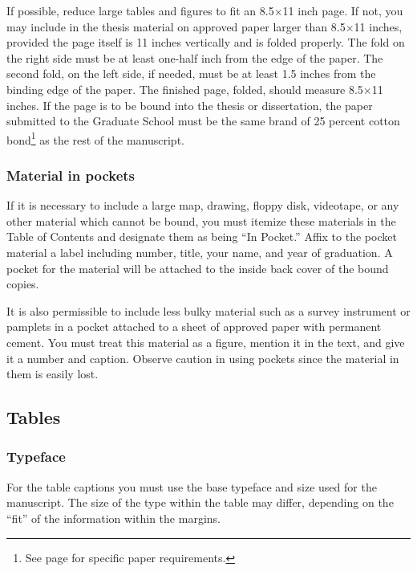 If possible, reduce large tables and figures to fit an 8.5$\times$11 inch
page. If not, you may include in the thesis material on
approved paper larger than 8.5$\times$11 inches, provided the page
itself is 11 inches vertically and is folded properly. The fold on the
right side must be at least one-half inch from the edge of the paper.
The second fold, on the left side, if needed, must be at least 1.5
inches from the binding edge of the paper. The finished page, folded,
should measure 8.5$\times$11 inches. If the page is to be bound into
the thesis or dissertation, the paper submitted to the Graduate School
must be the same brand of 25 percent cotton bond\footnote{See page
  \pageref{sec:PaperAndDuplication} for specific paper requirements.}
as the rest of the manuscript.

\subsubsection{Material in pockets}
\label{sec:MaterialInPockets}

If it is necessary to include a large map, drawing, floppy disk,
videotape, or any other material which cannot be bound, you must
itemize these materials in the Table of Contents and designate them as
being ``In Pocket.'' Affix to the pocket material a label including
number, title, your name, and year of graduation. A pocket for the
material will be attached to the inside back cover of the bound
copies.

It is also permissible to include less bulky material such as a survey
instrument or pamplets in a pocket attached to a sheet of approved
paper with permanent cement. You must treat this material as a figure,
mention it in the text, and give it a number and caption. Observe
caution in using pockets since the material in them is easily lost.

\subsection{Tables}
\label{sec:Tables}

\subsubsection{Typeface}
\label{sec:TableTypeface}

For the table captions you must use the base typeface and size used
for the manuscript. The size of the type within the table may differ,
depending on the ``fit'' of the information within the margins.

